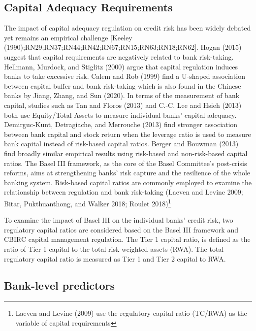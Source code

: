 \documentclass{article}
\begin{document}
\hypertarget{capital-adequacy-requirements}{%
\subsection{Capital Adequacy
Requirements}\label{capital-adequacy-requirements}}

The impact of capital adequacy regulation on credit risk has been widely
debated yet remains an empirical challenge {[}Keeley
(1990);RN29;RN37;RN44;RN42;RN67;RN15;RN63;RN18;RN62{]}. Hogan (2015)
suggest that capital requirements are negatively related to bank
risk-taking. Hellmann, Murdock, and Stiglitz (2000) argue that capital
regulation induces banks to take excessive risk. Calem and Rob (1999)
find a U-shaped association between capital buffer and bank risk-taking
which is also found in the Chinese banks by Jiang, Zhang, and Sun
(2020). In terms of the measurement of bank capital, studies such as Tan
and Floros (2013) and C.-C. Lee and Hsieh (2013) both use Equity/Total
Assets to measure individual banks' capital adequacy. Demirguc-Kunt,
Detragiache, and Merrouche (2013) find stronger association between bank
capital and stock return when the leverage ratio is used to measure bank
capital instead of risk-based capital ratios. Berger and Bouwman (2013)
find broadly similar empirical results using risk-based and
non-risk-based capital ratios. The Basel III framework, as the core of
the Basel Committee's post-crisis reforms, aims at strengthening banks'
risk capture and the resilience of the whole banking system. Risk-based
capital ratios are commonly employed to examine the relationship between
regulation and bank risk-taking (Laeven and Levine 2009; Bitar,
Pukthuanthong, and Walker 2018; Roulet 2018)\footnote{Laeven and Levine
  (2009) use the regulatory capital ratio (TC/RWA) as the variable of
  capital requirements}

To examine the impact of Basel III on the individual banks' credit risk,
two regulatory capital ratios are considered based on the Basel III
framework and CBIRC capital management regulation. The Tier 1 capital
ratio, is defined as the ratio of Tier 1 capital to the total
risk-weighted assets (RWA). The total regulatory capital ratio is
measured as Tier 1 and Tier 2 capital to RWA.

\hypertarget{bank-level-predictors}{%
\subsection{Bank-level predictors}\label{bank-level-predictors}}
\end{document}
